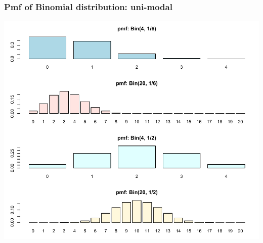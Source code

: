 \documentclass[slidestop,compress,mathserif]{beamer}
\begin{document}
%
%
%
%
\begin{frame}\frametitle{Pmf of Binomial distribution: uni-modal}

\vspace{-0.5cm}
\begin{center}
\includegraphics[scale = 0.6]{figures/pmf2}
\end{center}

\end{frame}


%
%
%
%
\end{document}
